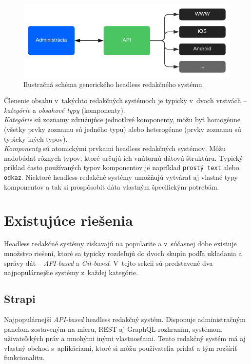 \begin{figure}[h]
	\centering
	\includegraphics{obrazky-figures/headless_cms_graph.pdf}
	\caption{Ilustračná schéma generického headless redakčného systému.}
\end{figure}

\noindent Členenie obsahu v~takýchto redakčných systémoch je typicky v~dvoch vrstvách -- \emph{kategórie} a \emph{obsahové typy} (komponenty). \\

\noindent \emph{Kategórie} sú zoznamy združujúce jednotlivé komponenty, môžu byť homogénne (všetky prvky zoznamu sú jedného typu) alebo heterogénne (prvky zoznamu sú typicky iných typov). \\

\noindent \emph{Komponenty} sú atomickými prvkami headless redakčných systémov. Môžu nadobúdať rôznych typov, ktoré určujú ich vnútornú dátovú štruktúru. Typický príklad často používaných typov komponentov je napríklad \texttt{prostý text} alebo \texttt{odkaz}. Niektoré headless redakčné systémy umožňujú vytvárať aj vlastné typy komponentov a tak si prospôsobiť dáta vlastným špecifickým potrebám.

\section{Existujúce riešenia}
Headless redakčné systémy získavajú na popularite a v~súčasnej dobe existuje množstvo riešení, ktoré sa typicky rozdeľujú do dvoch skupín podľa ukladania a správy dát -- \emph{API-based} a \emph{Git-based}. V~tejto sekcii sú predstavené dva najpopulárnejšie systémy z~každej kategórie.

\subsection{Strapi}
Najpopulárnejší \emph{API-based} headless redakčný systém. Disponuje administračným panelom zostaveným na mieru, REST aj GraphQL rozhraním, systémom uživateľských práv a mnohými inými vlastnosťami. Tento redakčný systém má aj vlastný obchod s~aplikáciami, ktoré si môžu používatelia pridať a tým rozšíriť funkcionalitu. 

